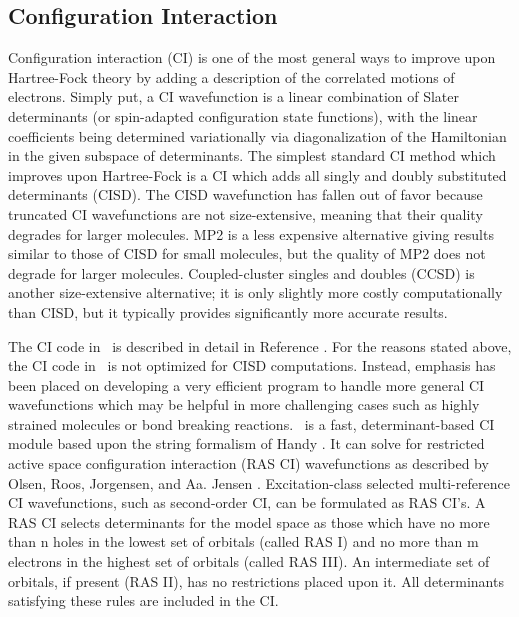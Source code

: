 \subsection{Configuration Interaction} \label{detci}

Configuration interaction (CI) is one of the most general ways to
improve upon Hartree-Fock theory by adding a description of the
correlated motions of electrons.  Simply put, a CI wavefunction
is a linear combination of Slater determinants (or spin-adapted
configuration state functions), with the linear coefficients being
determined variationally via diagonalization of the Hamiltonian in the
given subspace of determinants.  The simplest standard CI method which
improves upon Hartree-Fock is a CI which adds all singly and doubly
substituted determinants (CISD).  The CISD wavefunction has fallen out
of favor because truncated CI wavefunctions are not size-extensive,
meaning that their quality degrades for larger molecules.  MP2 is a less
expensive alternative giving results similar to those of CISD for small
molecules, but the quality of MP2 does not degrade for larger molecules.
Coupled-cluster singles and doubles (CCSD) is another size-extensive
alternative; it is only slightly more costly computationally than CISD,
but it typically provides significantly more accurate results.

The CI code in \PSIfour\ is described in detail in Reference
\cite{Sherrill:1999:CI}.  For the reasons stated above, the CI code in
\PSIfour\ is not optimized for CISD computations.  Instead, emphasis
has been placed on developing a very efficient program to handle more
general CI wavefunctions which may be helpful in more challenging cases
such as highly strained molecules or bond breaking reactions.  \PSIdetci\
is a fast, determinant-based CI module based upon the string formalism
of Handy \cite{Handy:1980}.  It can solve for restricted active space
configuration interaction (RAS CI) wavefunctions as described by Olsen,
Roos, Jorgensen, and Aa. Jensen \cite{Olsen:1988}.  Excitation-class
selected multi-reference CI wavefunctions, such as second-order CI,
can be formulated as RAS CI's.  A RAS CI selects determinants for the
model space as those which have no more than n holes in the lowest set
of orbitals (called RAS I) and no more than m electrons in the highest
set of orbitals (called RAS III).  An intermediate set of orbitals, if
present (RAS II), has no restrictions placed upon it.  All determinants
satisfying these rules are included in the CI.

